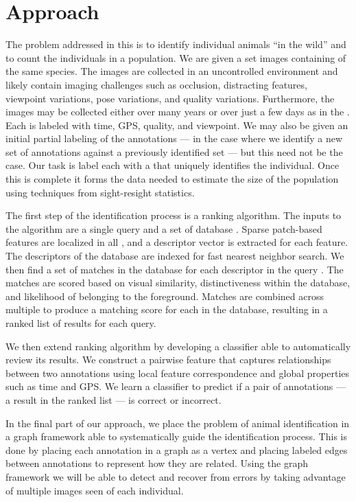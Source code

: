 \section{Approach}
    The problem addressed in this \thesis{} is to identify individual animals ``in the wild'' and to count the
    individuals in a population. We are given a set images containing \annots{} of the same species. The images are
    collected in an uncontrolled environment and likely contain imaging challenges such as occlusion, distracting
    features, viewpoint variations, pose variations, and quality variations. Furthermore, the images may be collected
    either over many years or over just a few days as in the \GZC{}. Each \annot{} is labeled with time, GPS, quality,
    and viewpoint. We may also be given an initial partial \name{} labeling of the annotations --- \eg{} in the case
    where we identify a new set of annotations against a previously identified set --- but this need not be the case.
    Our task is label each \annot{} with a \glossterm{\name{}} that uniquely identifies the individual. Once this is
    complete it forms the data needed to estimate the size of the population using techniques from sight-resight
    statistics.

    The first step of the identification process is a ranking algorithm. The inputs to the algorithm are a single query
    \annot{} and a set of database \annots{}. Sparse patch-based features are localized in all \annots{}, and a
    descriptor vector is extracted for each feature. The descriptors of the database \annots{} are indexed for fast
    nearest neighbor search. We then find a set of matches in the database for each descriptor in the query \annot{}.
    The matches are scored based on visual similarity, distinctiveness within the database, and likelihood of belonging
    to the foreground. Matches are combined across multiple \exemplar{} \annots{} to produce a matching score for each
    \name{} in the database, resulting in a ranked list of results for each query.

    We then extend ranking algorithm by developing a classifier able to automatically review its results. We construct a
    pairwise feature that captures relationships between two annotations using local feature correspondence and global
    properties such as time and GPS. We learn a classifier to predict if a pair of annotations --- \ie{} a result in the
    ranked list --- is correct or incorrect.

    In the final part of our approach, we place the problem of animal identification in a graph framework able to
    systematically guide the identification process. This is done by placing each annotation in a graph as a vertex and
    placing labeled edges between annotations to represent how they are related. Using the graph framework we will be
    able to detect and recover from errors by taking advantage of multiple images seen of each individual.

